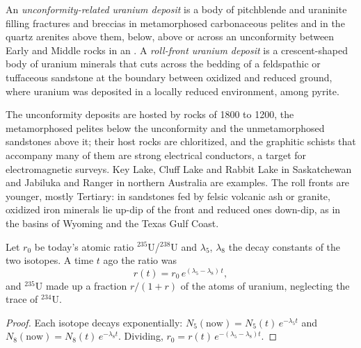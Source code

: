 \begin{definition}\label{def:b2:energy-geology:uranium}
An \emph{unconformity-related uranium deposit} is a body
of pitchblende and uraninite filling fractures and breccias in metamorphosed carbonaceous pelites and
in the quartz arenites above them, below, above or across an unconformity between Early and Middle
 rocks in an . A \emph{roll-front uranium deposit} is a crescent-shaped body of uranium minerals that cuts across the bedding of a
feldspathic or tuffaceous sandstone at the boundary between oxidized and reduced ground, where
uranium was deposited in a locally reduced environment, among pyrite.
\end{definition}

The unconformity deposits are hosted by rocks of 1800 to \qty{1200}{\Ma}, the metamorphosed
pelites below the unconformity and the unmetamorphosed sandstones above it; their host rocks are chloritized, and the graphitic schists that
accompany many of them are strong electrical conductors, a target for electromagnetic surveys. Key
Lake, Cluff Lake and Rabbit Lake in Saskatchewan and Jabiluka and Ranger in northern Australia are
examples. The roll fronts are younger, mostly Tertiary: in sandstones fed by felsic volcanic ash or
granite, oxidized iron minerals lie up-dip of the front and reduced ones down-dip, as in the basins
of Wyoming and the Texas Gulf Coast.

\begin{proposition}\label{prop:b2:energy-geology:u235}
Let $r_0$ be today's atomic ratio $^{235}$U/$^{238}$U and $\lambda_5$, $\lambda_8$ the decay
constants of the two isotopes. A time $t$ ago the ratio was
\begin{equation}
r(t) = r_0\,e^{(\lambda_5 - \lambda_8)\,t} ,
\label{eq:b2:energy-geology:u235}
\end{equation}
and $^{235}$U made up a fraction $r/(1 + r)$ of the atoms of uranium, neglecting the trace of
$^{234}$U.
\end{proposition}

\begin{proof}
Each isotope decays exponentially: $N_5(\text{now}) = N_5(t)\,e^{-\lambda_5 t}$ and $N_8(\text{now})
= N_8(t)\,e^{-\lambda_8 t}$. Dividing, $r_0 = r(t)\,e^{-(\lambda_5 - \lambda_8)t}$.
\end{proof}

